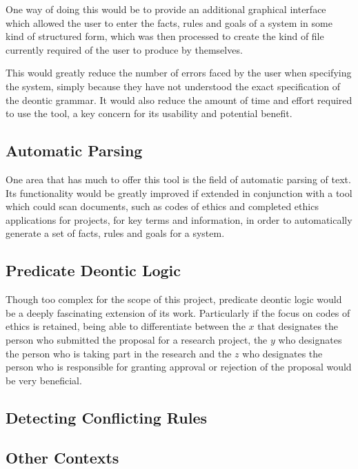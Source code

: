 \documentclass{l4proj}
\begin{document}
One way of doing this would be to provide an additional graphical interface which allowed the user to enter the facts, rules and goals of a system in some kind of structured form, which was then processed to create the kind of file currently required of the user to produce by themselves. 

This would greatly reduce the number of errors faced by the user when specifying the system, simply because they have not understood the exact specification of the deontic grammar. It would also reduce the amount of time and effort required to use the tool, a key concern for its usability and potential benefit. 

\subsection{Automatic Parsing}
One area that has much to offer this tool is the field of automatic parsing of text. Its functionality would be greatly improved if extended in conjunction with a tool which could scan documents, such as codes of ethics and completed ethics applications for projects, for key terms and information, in order to automatically generate a set of facts, rules and goals for a system. 

\subsection{Predicate Deontic Logic}
Though too complex for the scope of this project, predicate deontic logic would be a deeply fascinating extension of its work. Particularly if the focus on codes of ethics is retained, being able to differentiate between the $x$ that designates the person who submitted the proposal for a research project, the $y$ who designates the person who is taking part in the research and the $z$ who designates the person who is responsible for granting approval or rejection of the proposal would be very beneficial. 

\subsection{Detecting Conflicting Rules}
\subsection{Other Contexts}
\end{document}
